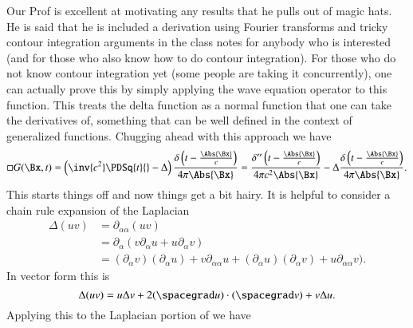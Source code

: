 %
%

Our Prof is excellent at motivating any results that he pulls out of magic hats.  He is said that he is included a derivation using Fourier transforms and tricky contour integration arguments in the class notes for anybody who is interested (and for those who also know how to do contour integration).  For those who do not know contour integration yet (some people are taking it concurrently), one can actually prove this by simply applying the wave equation operator to this function.  This treats the delta function as a normal function that one can take the derivatives of, something that can be well defined in the context of generalized functions.  Chugging ahead with this approach we have
%
\begin{equation}\label{eqn:relativisticElectrodynamicsL18:110}
\square G(\Bx, t)
=
\left(\inv{c^2} \PDSq{t}{} - \Delta\right)
\frac{\delta\left(t - \frac{\Abs{\Bx}}{c}\right)}{4 \pi \Abs{\Bx} }
=
\frac{\delta''\left(t - \frac{\Abs{\Bx}}{c}\right)}{4 \pi c^2 \Abs{\Bx} }
- \Delta \frac{\delta\left(t - \frac{\Abs{\Bx}}{c}\right)}{4 \pi \Abs{\Bx} }.
\end{equation}
%
This starts things off and now things get a bit hairy.  It is helpful to consider a chain rule expansion of the Laplacian
%
\begin{equation}\label{eqn:relativisticElectrodynamicsL18:760}
\begin{aligned}
\Delta (u v)
&=
\partial_{\alpha\alpha} (u v) \\
&=
\partial_{\alpha} (
v \partial_\alpha u
+ u\partial_\alpha v
) \\
&=
(\partial_\alpha v) (\partial_\alpha u ) + v \partial_{\alpha\alpha} u
+(\partial_\alpha u) (\partial_\alpha v ) + u \partial_{\alpha\alpha} v
).
\end{aligned}
\end{equation}
%
In vector form this is
%
\begin{equation}\label{eqn:relativisticElectrodynamicsL18:130}
\Delta (u v) = u \Delta v + 2 (\spacegrad u) \cdot (\spacegrad v) + v \Delta u.
\end{equation}
%
Applying this to the Laplacian portion of  we have
